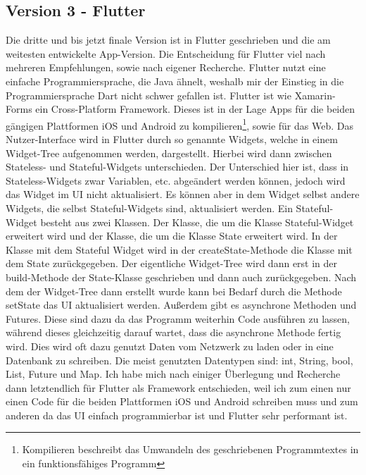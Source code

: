     \subsection{Version 3 - Flutter}
    Die dritte und bis jetzt finale Version ist in Flutter geschrieben und die am weitesten entwickelte App-Version.
    Die Entscheidung für Flutter viel nach mehreren Empfehlungen, sowie nach eigener Recherche. 
    Flutter nutzt eine einfache Programmiersprache, die Java ähnelt, weshalb mir der Einstieg in die
    Programmiersprache Dart\cite{Dart} nicht schwer gefallen ist. Flutter ist wie Xamarin-Forms ein 
    Cross-Platform Framework. Dieses ist in der Lage Apps für die beiden gängigen Plattformen iOS und Android 
    zu kompilieren\footnote{Kompilieren beschreibt das Umwandeln des geschriebenen Programmtextes in ein 
    funktionsfähiges Programm}, sowie für das Web.
    Das Nutzer-Interface wird in Flutter durch so genannte Widgets, welche in einem Widget-Tree 
    aufgenommen werden, dargestellt. Hierbei wird dann zwischen Stateless\cite{Stateless-Widget}-
    und Stateful\cite{Stateful-Widget}-Widgets unterschieden. Der Unterschied hier ist, dass in Stateless-Widgets
    zwar Variablen, etc. abgeändert werden können, jedoch wird das Widget im UI nicht aktualisiert. 
    Es können aber in dem Widget selbst andere Widgets, die selbst Stateful-Widgets sind, aktualisiert werden.
    Ein Stateful-Widget besteht aus zwei Klassen. Der Klasse, die um die Klasse Stateful-Widget erweitert wird 
    und der Klasse, die um die Klasse State erweitert wird. In der Klasse mit dem Stateful Widget wird in der
    createState-Methode die Klasse mit dem State zurückgegeben. Der eigentliche Widget-Tree wird dann erst in
    der build-Methode der State-Klasse geschrieben und dann auch zurückgegeben.
    Nach dem der Widget-Tree dann erstellt wurde kann bei Bedarf durch die Methode setState das UI aktualisiert werden.
    Außerdem gibt es asynchrone Methoden und Futures\cite{Futures}.
    Diese sind dazu da das Programm weiterhin Code ausführen zu lassen, während dieses gleichzeitig darauf 
    wartet, dass die asynchrone Methode fertig wird. Dies wird oft dazu genutzt Daten vom Netzwerk zu laden
    oder in eine Datenbank zu schreiben. Die meist genutzten Datentypen sind: int, String, bool, List, Future und Map.
    Ich habe mich nach einiger Überlegung und Recherche dann letztendlich für Flutter als Framework 
    entschieden, weil ich zum einen nur einen Code für die beiden Plattformen iOS und Android schreiben muss 
    und zum anderen da das UI einfach programmierbar ist und Flutter sehr performant ist.